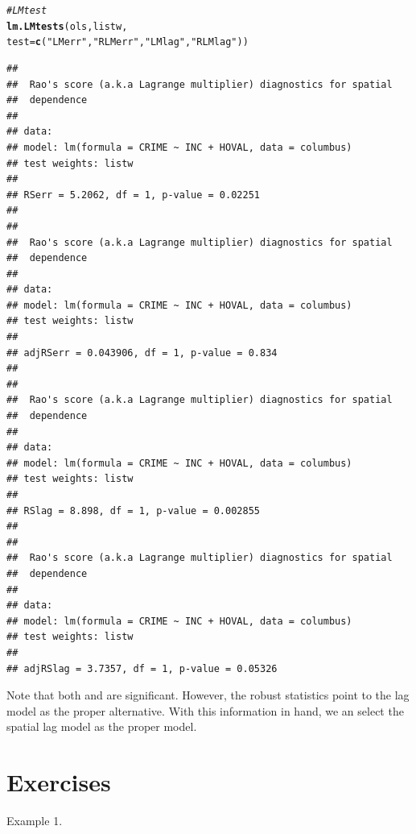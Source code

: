 \documentclass[english,12pt]{book}\usepackage[]{graphicx}\usepackage[]{xcolor}
\makeatletter
\newcommand{\hlsng}[1]{\textcolor[rgb]{0.192,0.494,0.8}{#1}}%
\newcommand{\hlcom}[1]{\textcolor[rgb]{0.678,0.584,0.686}{\textit{#1}}}%
\newcommand{\hldef}[1]{\textcolor[rgb]{0.345,0.345,0.345}{#1}}%
\newcommand{\hlkwc}[1]{\textcolor[rgb]{0.333,0.667,0.333}{#1}}%
\newcommand{\hlkwd}[1]{\textcolor[rgb]{0.737,0.353,0.396}{\textbf{#1}}}%
\newenvironment{kframe}{%
 \def\at@end@of@kframe{}%
 \ifinner\ifhmode%
  \def\at@end@of@kframe{\end{minipage}}%
  \begin{minipage}{\columnwidth}%
 \fi\fi%
 \def\FrameCommand##1{\hskip\@totalleftmargin \hskip-\fboxsep
 \colorbox{shadecolor}{##1}\hskip-\fboxsep
     \hskip-\linewidth \hskip-\@totalleftmargin \hskip\columnwidth}%
 \MakeFramed {\advance\hsize-\width
   \@totalleftmargin\z@ \linewidth\hsize
   \@setminipage}}%
 {\par\unskip\endMakeFramed%
 \at@end@of@kframe}
\newenvironment{knitrout}{}{} %
\makeatother
\begin{document}
\begin{knitrout}
\color{fgcolor}\begin{kframe}
\begin{alltt}
\hlcom{# LM test}
\hlkwd{lm.LMtests}\hldef{(ols, listw,}
           \hlkwc{test} \hldef{=} \hlkwd{c}\hldef{(}\hlsng{"LMerr"}\hldef{,} \hlsng{"RLMerr"}\hldef{,} \hlsng{"LMlag"}\hldef{,} \hlsng{"RLMlag"}\hldef{))}
\end{alltt}


{\ttfamily\noindent\itshape\color{messagecolor}{\#\# Please update scripts to use lm.RStests in place of lm.LMtests}}\begin{verbatim}
## 
## 	Rao's score (a.k.a Lagrange multiplier) diagnostics for spatial
## 	dependence
## 
## data:  
## model: lm(formula = CRIME ~ INC + HOVAL, data = columbus)
## test weights: listw
## 
## RSerr = 5.2062, df = 1, p-value = 0.02251
## 
## 
## 	Rao's score (a.k.a Lagrange multiplier) diagnostics for spatial
## 	dependence
## 
## data:  
## model: lm(formula = CRIME ~ INC + HOVAL, data = columbus)
## test weights: listw
## 
## adjRSerr = 0.043906, df = 1, p-value = 0.834
## 
## 
## 	Rao's score (a.k.a Lagrange multiplier) diagnostics for spatial
## 	dependence
## 
## data:  
## model: lm(formula = CRIME ~ INC + HOVAL, data = columbus)
## test weights: listw
## 
## RSlag = 8.898, df = 1, p-value = 0.002855
## 
## 
## 	Rao's score (a.k.a Lagrange multiplier) diagnostics for spatial
## 	dependence
## 
## data:  
## model: lm(formula = CRIME ~ INC + HOVAL, data = columbus)
## test weights: listw
## 
## adjRSlag = 3.7357, df = 1, p-value = 0.05326
\end{verbatim}
\end{kframe}
\end{knitrout}

Note that both  and  are significant. However, the robust statistics point to the lag model as the proper alternative. With this information in hand, we an select the spatial lag model as the proper model. 

\section{Exercises}

\begin{exercises}
    \exercise Example 1. 
\end{exercises}    
    
\end{document}
